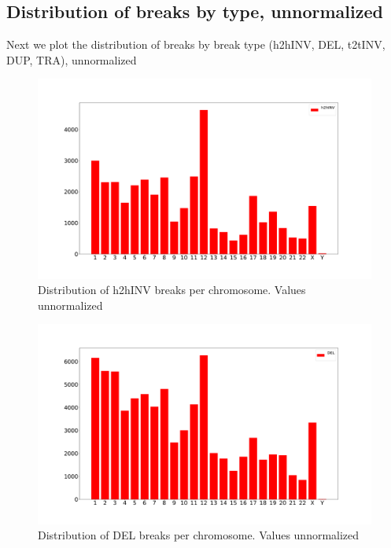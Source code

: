 \documentclass[a4paper,10pt]{article}
\begin{document}
\subsection*{Distribution of breaks by type, unnormalized}

Next we plot the distribution of breaks by break type (h2hINV, DEL, t2tINV, DUP, TRA), unnormalized

\begin{figure}[H]
\includegraphics[scale=0.2]{figures/h2hINV_Break_distribution_unnormalized.pdf}
\caption{Distribution of h2hINV breaks per chromosome. Values unnormalized}
\end{figure}

\begin{figure}[H]
\includegraphics[scale=0.2]{figures/DEL_Break_distribution_unnormalized.pdf}
\caption{Distribution of DEL breaks per chromosome. Values unnormalized}
\end{figure}
\end{document}
